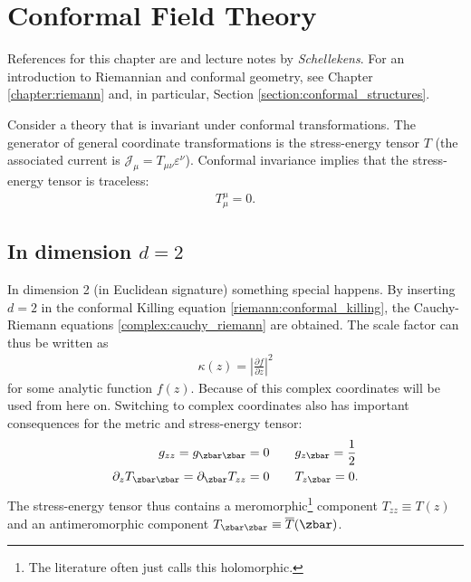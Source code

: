 \chapter{Conformal Field Theory}\label{chapter:cft}

    References for this chapter are \cite{CFT} and lecture notes by \textit{Schellekens}. For an introduction to Riemannian and conformal geometry, see Chapter \ref{chapter:riemann} and, in particular, Section \ref{section:conformal_structures}.

    \begin{property}
        Consider a theory that is invariant under conformal transformations. The generator of general coordinate transformations is the stress-energy tensor $T$ (the associated current is $\mathcal{J}_\mu = T_{\mu\nu}\varepsilon^\nu$). Conformal invariance implies that the stress-energy tensor is traceless:
        \begin{gather}
            T^\mu_\mu = 0.
        \end{gather}
    \end{property}

\section{\texorpdfstring{In dimension $d=2$}{In dimension d=2}}

    In dimension 2 (in Euclidean signature) something special happens. By inserting $d=2$ in the conformal Killing equation \eqref{riemann:conformal_killing}, the Cauchy-Riemann equations \ref{complex:cauchy_riemann} are obtained. The scale factor can thus be written as
    \begin{gather}
        \kappa(z) = \left|\frac{\partial f}{\partial z}\right|^2
    \end{gather}
    for some analytic function $f(z)$. Because of this complex coordinates will be used from here on. Switching to complex coordinates also has important consequences for the metric and stress-energy tensor:
    \begin{align}
        g_{zz} = g_{\zbar\zbar} = 0&\qquad g_{z\zbar} = \frac{1}{2}\\
        \partial_zT_{\zbar\zbar} = \partial_{\zbar} T_{zz} = 0&\qquad T_{z\zbar} = 0.
    \end{align}
    The stress-energy tensor thus contains a meromorphic\footnote{The literature often just calls this holomorphic.} component $T_{zz}\equiv T(z)$ and an antimeromorphic component $T_{\zbar\zbar}\equiv\overline{T}(\zbar)$.

